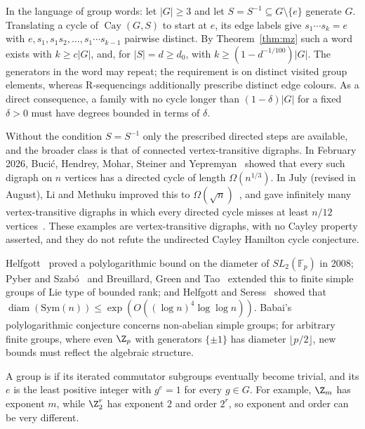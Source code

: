 In the language of group words: let $|G|\geq3$ and let $S=S^{-1}\subseteq G\setminus\{e\}$ generate $G$. Translating a cycle of $\operatorname{Cay}(G,S)$ to start at $e$, its edge labels give $s_1\cdots s_k=e$ with $e,s_1,s_1s_2,\dots,s_1\cdots s_{k-1}$ pairwise distinct. By Theorem~\ref{thm:mz} such a word exists with $k\geq c|G|$, and, for $|S|=d\geq d_0$, with $k\geq(1-d^{-1/100})|G|$. The generators in the word may repeat; the requirement is on distinct visited group elements, whereas R-sequencings additionally prescribe distinct edge colours. As a direct consequence, a family with no cycle longer than $(1-\delta)|G|$ for a fixed $\delta>0$ must have degrees bounded in terms of $\delta$.


Without the condition $S=S^{-1}$ only the prescribed directed steps are available, and the broader class is that of connected vertex-transitive digraphs. In February 2026, Buci\'c, Hendrey, Mohar, Steiner and Yepremyan~\cite{bhmsy26} showed that every such digraph on $n$ vertices has a directed cycle of length $\Omega(n^{1/3})$. In July (revised in August), Li and Methuku improved this to $\Omega(\sqrt n)$~\cite[Theorem~1.5]{lmd26}, and gave infinitely many vertex-transitive digraphs in which every directed cycle misses at least $n/12$ vertices~\cite[Theorem~1.3]{lmd26}. These examples are vertex-transitive digraphs, with no Cayley property asserted, and they do not refute the undirected Cayley Hamilton cycle conjecture.


Helfgott~\cite{hel08} proved a polylogarithmic bound on the diameter of $SL_2(\mathbb F_p)$ in 2008; Pyber and Szab\'o~\cite{ps10} and Breuillard, Green and Tao~\cite{bgt11} extended this to finite simple groups of Lie type of bounded rank; and Helfgott and Seress~\cite{hs14} showed that $\operatorname{diam}(\mathrm{Sym}(n))\leq\exp(O((\log n)^4\log\log n))$. Babai's polylogarithmic conjecture concerns non-abelian simple groups; for arbitrary finite groups, where even $\Z_p$ with generators $\{\pm1\}$ has diameter $\lfloor p/2\rfloor$, new bounds must reflect the algebraic structure.

A group is  if its iterated commutator subgroups eventually become trivial, and its  $e$ is the least positive integer with $g^e=1$ for every $g\in G$. For example, $\Z_m$ has exponent $m$, while $\Z_2^r$ has exponent $2$ and order $2^r$, so exponent and order can be very different.

